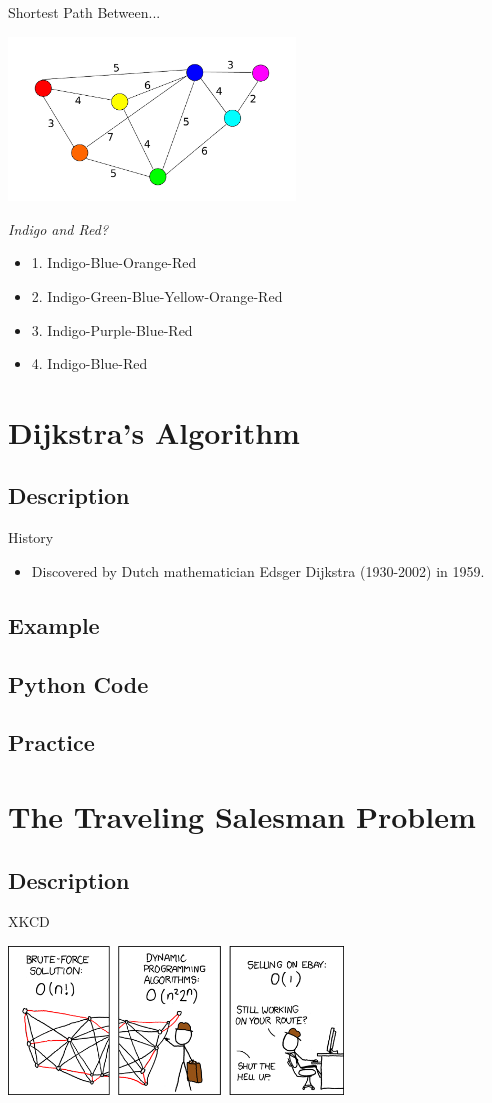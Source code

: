 \documentclass{beamer}
\begin{document}
\begin{frame}{Shortest Path Between...}
	\centerline{\includegraphics[width=3.0in]{weighted.pdf}}
	\textit{Indigo and Red?}
        \begin{itemize}
	\item
		1. Indigo-Blue-Orange-Red
	\item
		2. Indigo-Green-Blue-Yellow-Orange-Red
	\item
		3. Indigo-Purple-Blue-Red
	\item
		\alert{4. Indigo-Blue-Red}
	\end{itemize}
\end{frame}

\section{Dijkstra's Algorithm}
\subsection{Description}

\begin{frame}{History}
\begin{itemize}
\item
	Discovered by Dutch mathematician Edsger Dijkstra (1930-2002) in 1959.
\end{itemize}
\end{frame}

\subsection{Example}
\subsection{Python Code}
\subsection{Practice}

\section{The Traveling Salesman Problem}
\subsection{Description}
\begin{frame}{XKCD}
\centerline{\includegraphics[width=3.5in]{travelling_salesman_problem.png}}
\end{frame}
\end{document}
